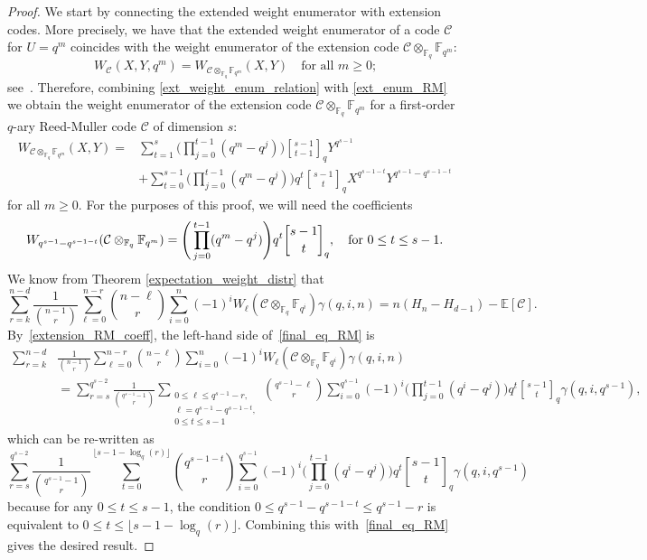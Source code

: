\documentclass[11pt,a4paper,reqno,twoside]{article}
\theoremstyle{definition}
\newcommand{\F}{\mathbb{F}}
\newcommand{\E}{\mathbb{E}}
\newcommand{\mC}{\mathcal{C}}
\newcommand{\qbinom}[2]{\genfrac{[}{]}{0pt}{}{#1}{#2}}
\begin{document}
\begin{proof}
We start by 
connecting the 
extended weight enumerator 
with extension codes.
More precisely, we have that
the extended weight enumerator of a code $\mC$ for $U = q^m$ coincides with the weight enumerator of the extension code $\mC \otimes_{\F_q} \F_{q^m}$:
   \begin{equation} \label{ext_weight_enum_relation}
        W_{\mC}(X,Y,q^m) = W_{\mC \otimes_{\F_q} \F_{q^m}}(X,Y) \quad \mbox{for all $m \ge 0$;}
    \end{equation}
see~\cite[Proposition 5]{ext_weight_jurrius}.
Therefore, 
combining \eqref{ext_weight_enum_relation} with \eqref{ext_enum_RM} we obtain the weight enumerator of the extension code $\mC \otimes_{\F_q} \F_{q^m}$ for a first-order $q$-ary Reed-Muller code $\mC$ of dimension $s$:
\[
\begin{split}
W_{\mC \otimes_{\F_q} \F_{q^m}}(X,Y) = &\sum_{t=1}^s  \Bigg( \prod_{j=0}^{t-1} (q^m - q^j) \Bigg) \qbinom{s-1}{t-1}_q Y^{q^{s-1}} \\
        &+ \sum_{t=0}^{s-1} \Bigg( \prod_{j=0}^{t-1} (q^m - q^j) \Bigg) q^t \qbinom{s-1}{t}_q X^{q^{s-1-t}} Y^{q^{s-1}-q^{s-1-t}}
\end{split}
\]
for all $m \ge 0$.
For the purposes of this proof,
we will need the coefficients 
\begin{equation} \label{extension_RM_coeff}
    W_{q^{s-1}-q^{s-1-t}}(\mC \otimes_{\F_q} \F_{q^m}) = \Bigg( \prod_{j=0}^{t-1} (q^m - q^j) \Bigg) q^t \qbinom{s-1}{t}_q, \quad \textnormal{for $0 \le t \le s-1.$}  
\end{equation}
We know from Theorem \ref{expectation_weight_distr} that
\begin{equation} \label{final_eq_RM}
    \sum_{r=k}^{n-d} \frac{1}{\binom{n-1}{r}} \sum_{\ell=0}^{n-r} \binom{n-\ell}{r} \sum_{i=0}^n (-1)^i W_{\ell}(\mC  \otimes_{\F_q}  \F_{q^i}) \gamma(q,i,n) =  n(H_n - H_{d-1}) -\E[\mC].
\end{equation}
By~\eqref{extension_RM_coeff}, the left-hand side of~\eqref{final_eq_RM} is  
\[
\begin{split}
    \sum_{r=k}^{n-d}& \frac{1}{\binom{n-1}{r}} \sum_{\ell=0}^{n-r} \binom{n-\ell}{r} \sum_{i=0}^n (-1)^i W_{\ell}(\mC \otimes_{\F_q} \F_{q^i}) \gamma(q,i,n) \\
    &= \sum_{r=s}^{q^{s-2}} \frac{1}{\binom{q^{s-1}-1}{r}}\sum_{\substack{0\le \ell \le q^{s-1}-r, \\ \ell = q^{s-1} - q^{s-1-t}, \\ 0 \le t \le s-1}} \binom{q^{s-1}-\ell}{r} \sum_{i=0}^{q^{s-1}} (-1)^i  \Bigg( \prod_{j=0}^{t-1} (q^i - q^j) \Bigg) q^t \qbinom{s-1}{t}_q \gamma(q,i,q^{s-1}),
\end{split}
\]
which can be re-written as
\[
\sum_{r=s}^{q^{s-2}} \frac{1}{\binom{q^{s-1}-1}{r}}\sum_{t=0}^{\lfloor s-1-\log_q(r) \rfloor} \binom{q^{s-1-t}}{r} \sum_{i=0}^{q^{s-1}} (-1)^i  \Bigg( \prod_{j=0}^{t-1} (q^i - q^j) \Bigg) q^t \qbinom{s-1}{t}_q \gamma(q,i,q^{s-1})
\]
because for any $ 0 \le t \le s-1$, the condition $0 \le q^{s-1} - q^{s-1-t} \le q^{s-1}-r$ is equivalent 
to $0 \le t \le \lfloor s-1-\log_q(r) \rfloor$. 
Combining this with~\eqref{final_eq_RM} gives the desired result.
\end{proof}
\end{document}
